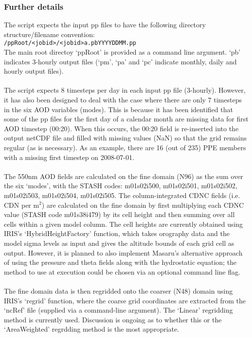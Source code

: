 \documentclass[10pt,a4paper]{article}
\newcommand\tab[1][0.5cm]{\hspace*{#1}}
\begin{document}
\subsubsection{Further details}
The script expects the input pp files to have the following directory structure/filename convention:\\
\tab \texttt{/ppRoot/<jobid>/<jobid>a.pbYYYYDDMM.pp}\\
The main root directoy `ppRoot' is provided as a command line argument. `pb' indicates 3-hourly output files (`pm', `pa' and `pc' indicate monthly, daily and hourly output files).\\\\
The script expects 8 timesteps per day in each input pp file (3-hourly). However, it has also been designed to deal with the case where there are only 7 timesteps in the six AOD variables (modes). This is because it has been identified that some of the pp files for the first day of a calendar month are missing data for first AOD timestep (00:20). When this occurs, the 00:20 field is re-inserted into the output netCDF file and filled with missing values (NaN) so that the grid remains regular (as is necessary). As an example, there are 16 (out of 235) PPE members with a missing first timestep on 2008-07-01.\\\\
The 550nm AOD fields are calculated on the fine domain (N96) as the sum over the six `modes', with the STASH codes: m01s02i500, m01s02i501, m01s02i502, m01s02i503, m01s02i504, m01s02i505. The column-integrated CDNC fields (i.e. CDN per m$^2$) are calculated on the fine domain by first multiplying each CDNC value (STASH code m01s38i479) by its cell height and then summing over all cells within a given model column. The cell heights are currently obtained using IRIS's `HybridHeightFactory' function, which takes orography data and the model sigma levels as input and gives the altitude bounds of each grid cell as output. However, it is planned to also implement Masaru's alternative approach of using the pressure and theta fields along with the hydrostatic equation; the method to use at execution could be chosen via an optional command line flag.\\\\
The fine domain data is then regridded onto the coarser (N48) domain using IRIS's `regrid' function, where the coarse grid coordinates are extracted from the `ncRef' file (supplied via a command-line argument). The `Linear' regridding method is currently used. Discussion is ongoing as to whether this or the `AreaWeighted' regrdding method is the most appropriate.\\\\
\end{document}
